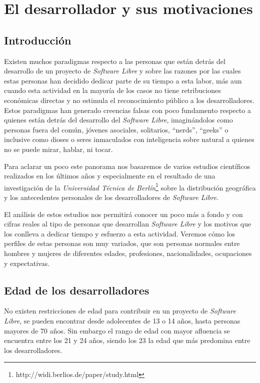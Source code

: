 \chapter{El desarrollador y sus motivaciones}
\label{CHAP3:Developer}
\section{Introducción}

Existen muchos paradigmas respecto a las personas que están detrás del desarrollo de un proyecto de \textit{Software Libre} y sobre las razones por las cuales estas personas han decidido dedicar parte de su tiempo a esta labor, más aun cuando esta actividad en la mayoría de los casos no tiene retribuciones económicas directas y no estimula el reconocimiento público a los desarrolladores. Estos paradigmas han  generado creencias falsas con poco fundamento respecto a quienes están detrás del desarrollo del \textit{Software Libre}, imaginándolos como personas fuera del común, jóvenes asociales, solitarios, “nerds”, “geeks” o inclusive como dioses o seres inmaculados con inteligencia sobre natural a quienes no se puede mirar, hablar, ni tocar.

Para aclarar un poco este panorama nos basaremos de varios estudios científicos realizados en los últimos años y especialmente en el resultado de una investigación de la \textit{Universidad Técnica de Berlín}\footnote{ http://widi.berlios.de/paper/study.html }  sobre la distribución geográfica y los antecedentes personales de los desarrolladores de \textit{Software Libre}. 

El análisis de estos estudios nos permitirá conocer un poco más a fondo y con cifras reales  al tipo de personas que desarrollan \textit{Software Libre} y los motivos que los conlleva a dedicar tiempo y esfuerzo a esta actividad. Veremos cómo los perfiles de estas personas son muy variados, que son personas normales entre hombres y mujeres de diferentes edades, profesiones, nacionalidades, ocupaciones y expectativas.

\section{Edad de los desarrolladores}

No existen restricciones de edad para contribuir en un proyecto de \textit{Software Libre}, se pueden encontrar desde adolecentes de 13 o 14 años, hasta personas mayores de 70 años. Sin embargo el rango de edad con mayor afluencia se encuentra entre los 21 y 24 años, siendo los 23 la edad que más predomina entre los desarrolladores. 

